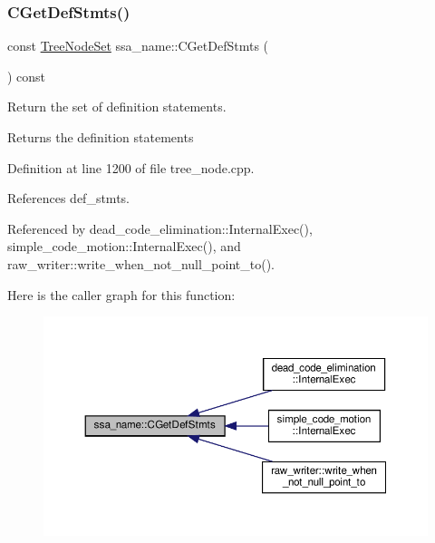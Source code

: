 \subsubsection{\texorpdfstring{C\+Get\+Def\+Stmts()}{CGetDefStmts()}}
{\footnotesize\ttfamily const \hyperlink{classTreeNodeSet}{Tree\+Node\+Set} ssa\+\_\+name\+::\+C\+Get\+Def\+Stmts (\begin{DoxyParamCaption}{ }\end{DoxyParamCaption}) const}



Return the set of definition statements. 

\begin{DoxyReturn}{Returns}
the definition statements 
\end{DoxyReturn}


Definition at line 1200 of file tree\+\_\+node.\+cpp.



References def\+\_\+stmts.



Referenced by dead\+\_\+code\+\_\+elimination\+::\+Internal\+Exec(), simple\+\_\+code\+\_\+motion\+::\+Internal\+Exec(), and raw\+\_\+writer\+::write\+\_\+when\+\_\+not\+\_\+null\+\_\+point\+\_\+to().

Here is the caller graph for this function\+:
\nopagebreak
\begin{figure}[H]
\begin{center}
\leavevmode
\includegraphics[width=350pt]{db/d2f/structssa__name_acfdd901ceb0b0c109c6aeb8ab905aa16_icgraph}
\end{center}
\end{figure}
\mbox{\label{structssa__name_ac3fa81e7dc097efbbcd404224f8309cd}} 
